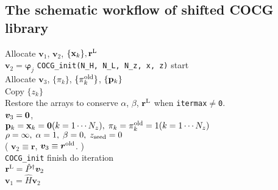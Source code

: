 \documentclass[12pt,titlepage]{article}
\renewenvironment{leftbar}{%
  \def\FrameCommand{\vrule width 1pt \hspace{0pt}}%
  \MakeFramed {\advance\hsize-\width \FrameRestore}}%
 {\endMakeFramed}
\begin{document}
\subsection{The schematic workflow of shifted COCG library}

\noindent
Allocate ${\boldsymbol v}_1$, ${\boldsymbol v}_2$, $\{{\bf x}_k\}, {\bf r}^{\rm L}$
\\ 
${\boldsymbol v}_2 = {\boldsymbol \varphi_j}$
\vspace{-1em}
\begin{leftbar}
  \noindent
  \verb|COCG_init(N_H, N_L, N_z, x, z)| start
  \\ \hspace{0.5cm}
  Allocate ${\boldsymbol v}_3$, $\{\pi_k\}$, $\{\pi_k^{\rm old}\}$, $\{{\bf p}_k\}$
  \\ \hspace{0.5cm}
  Copy $\{z_k\}$
  \\ \hspace{0.5cm}
    Restore the arrays to conserve $\alpha$, $\beta$, ${\bf r}^{\rm L}$ when  \verb|itermax|$\neq$\verb|0|.
  \\ \hspace{0.5cm}
  ${\boldsymbol v}_3 = {\bf 0}$,
  \\ \hspace{0.5cm}
  ${\bf p}_{k} = {\bf x}_k = {\bf 0}(k=1 \cdots N_z),\; \pi_k=\pi_k^{\rm old} = 1(k=1 \cdots N_z)$ 
  \\ \hspace{0.5cm}
  $\rho = \infty,\; \alpha = 1,\; \beta=0,\; z_{\rm seed}=0$ 
  \\ \hspace{0.5cm}
  (
  ${\boldsymbol v}_2 \equiv {\boldsymbol r}$, 
  ${\boldsymbol v}_3 \equiv {\boldsymbol r}^{\rm old}$. )
  \\
  \verb|COCG_init| finish
\end{leftbar}
\vspace{-1em}
\noindent
do iteration
\\\hspace{0.5cm}
${\bf r}^{\rm L} = {\hat P}^\dagger {\boldsymbol v}_2$
\\\hspace{0.5cm}
${\boldsymbol v}_1 = {\hat H} {\boldsymbol v}_2$
\vspace{-1em}
\end{document}
